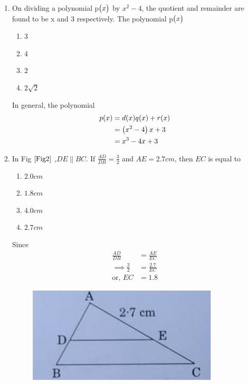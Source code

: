 \documentclass[journal,12pt,twocolumn]{IEEEtran}
\begin{document}
\begin{enumerate}[label=1.\arabic*]
 \item On dividing a polynomial p$\begin{pmatrix}x\end{pmatrix}$ by $x^2 - 4$, the quotient and remainder are found to be x and 3 respectively. The polynomial p$\begin{pmatrix}x\end{pmatrix}$
 \begin{enumerate}
    \item $3$
    \item $4$
    \item $2$
    \item $2\sqrt{2}$
\end{enumerate}
\solution In general, the polynomial
\begin{align}
	p(x) &= d(x)q(x) + r(x)
	\\
	&= \left(x^2-4\right)x +3
	\\
	&= x^3 - 4x + 3
\end{align}
\item In Fig $\ref{Fig2}$ ,$DE \parallel BC$. If $\frac{AD}{DB} = \frac{3}{2}$ and $AE = 2.7cm$, then $EC$ is equal to 
\begin{enumerate}
    \item $2.0 cm$
    \item $1.8 cm$
    \item $4.0 cm$
    \item $2.7 cm$
\end{enumerate}
\solution Since 
\begin{align}
	\frac{AD}{DB}  &= 
	\frac{AE}{EC}
	\\
	\implies \frac{3}{2}&= \frac{2.7}{EC}
	\\
	\text{or, }
	EC & = 1.8
\end{align}

\begin{figure}[h!]
    \centering
    \includegraphics[width=0.5\columnwidth]{Fig2.png}
	\caption{}
	\label{Fig2}
 \end{figure}
 

\end{enumerate}
\end{document}
